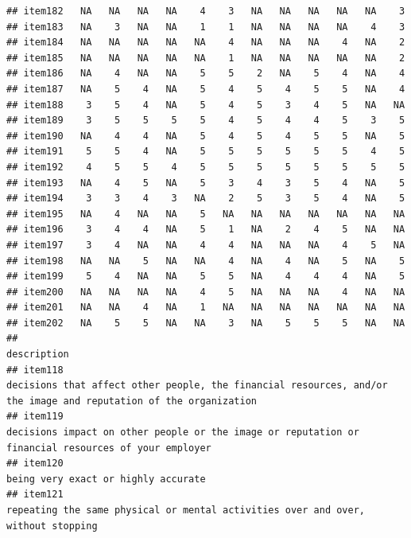 \documentclass[
  man]{apa6}
\begin{document}
\begin{verbatim}
## item182   NA   NA   NA   NA    4    3   NA   NA   NA   NA   NA    3
## item183   NA    3   NA   NA    1    1   NA   NA   NA   NA    4    3
## item184   NA   NA   NA   NA   NA    4   NA   NA   NA    4   NA    2
## item185   NA   NA   NA   NA   NA    1   NA   NA   NA   NA   NA    2
## item186   NA    4   NA   NA    5    5    2   NA    5    4   NA    4
## item187   NA    5    4   NA    5    4    5    4    5    5   NA    4
## item188    3    5    4   NA    5    4    5    3    4    5   NA   NA
## item189    3    5    5    5    5    4    5    4    4    5    3    5
## item190   NA    4    4   NA    5    4    5    4    5    5   NA    5
## item191    5    5    4   NA    5    5    5    5    5    5    4    5
## item192    4    5    5    4    5    5    5    5    5    5    5    5
## item193   NA    4    5   NA    5    3    4    3    5    4   NA    5
## item194    3    3    4    3   NA    2    5    3    5    4   NA    5
## item195   NA    4   NA   NA    5   NA   NA   NA   NA   NA   NA   NA
## item196    3    4    4   NA    5    1   NA    2    4    5   NA   NA
## item197    3    4   NA   NA    4    4   NA   NA   NA    4    5   NA
## item198   NA   NA    5   NA   NA    4   NA    4   NA    5   NA    5
## item199    5    4   NA   NA    5    5   NA    4    4    4   NA    5
## item200   NA   NA   NA   NA    4    5   NA   NA   NA    4   NA   NA
## item201   NA   NA    4   NA    1   NA   NA   NA   NA   NA   NA   NA
## item202   NA    5    5   NA   NA    3   NA    5    5    5   NA   NA
##                                                                                                                                                                                                                       description
## item118                                                                                                          decisions that affect other people, the financial resources, and/or the image and reputation of the organization
## item119                                                                                                                       decisions impact on other people or the image or reputation or financial resources of your employer
## item120                                                                                                                                                                                       being very exact or highly accurate
## item121                                                                                                                                          repeating the same physical or mental activities over and over, without stopping

\end{verbatim}
\end{document}
